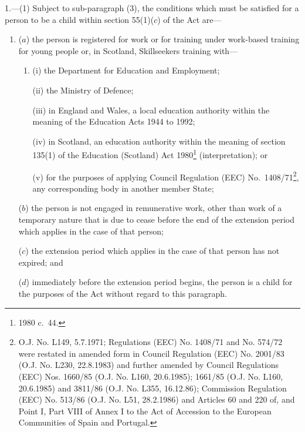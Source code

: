 \documentclass[12pt,a4paper]{article}
\begin{document}
1.---(1)  Subject to sub-paragraph (3), the conditions which must be satisfied for a person to be a child within section 55(1)($c$)  of the Act are—
\begin{enumerate}\item[]
($a$) the person is registered for work or for training under work-based training for young people or, in Scotland, Skillseekers training with—
\begin{enumerate}\item[]
(i) the Department for Education and Employment;

(ii) the Ministry of Defence;

(iii) in England and Wales, a local education authority within the meaning of the Education Acts 1944 to 1992;

\pagebreak[3]

(iv) in Scotland, an education authority within the meaning of section 135(1) of the Education (Scotland) Act 1980\footnote{1980 c.\ 44.} (interpretation); or

(v) for the purposes of applying Council Regulation (EEC) No.\ 1408/\hspace{0pt}71\footnote{\frenchspacing O.J. No. L149, 5.7.1971; Regulations (EEC) No. 1408/71 and No. 574/72 were restated in amended form in Council Regulation (EEC) No. 2001/83 (O.J. No. L230, 22.8.1983) and further amended by Council Regulations (EEC) Nos. 1660/85 (O.J. No. L160, 20.6.1985); 1661/85 (O.J. No. L160, 20.6.1985) and 3811/86 (O.J. No. L355, 16.12.86); Commission Regulation (EEC) No. 513/86 (O.J. No. L51, 28.2.1986) and Articles 60 and 220 of, and Point I, Part VIII of Annex I to the Act of Accession to the European Communities of Spain and Portugal.}, any corresponding body in another member State;
\end{enumerate}

($b$) the person is not engaged in remunerative work, other than work of a temporary nature that is due to cease before the end of the extension period which applies in the case of that person;

($c$) the extension period which applies in the case of that person has not expired; and

($d$) immediately before the extension period begins, the person is a child for the purposes of the Act without regard to this paragraph.
\end{enumerate}
\end{document}
